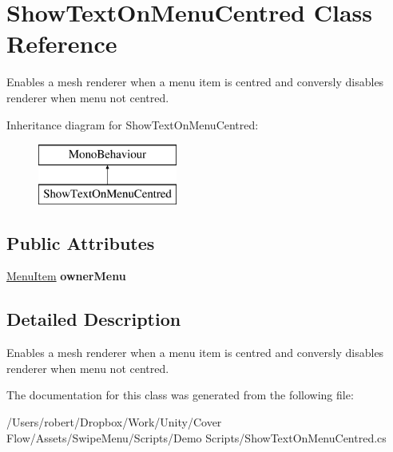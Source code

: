 \hypertarget{class_show_text_on_menu_centred}{}\section{Show\+Text\+On\+Menu\+Centred Class Reference}
\label{class_show_text_on_menu_centred}


Enables a mesh renderer when a menu item is centred and conversly disables renderer when menu not centred.  


Inheritance diagram for Show\+Text\+On\+Menu\+Centred\+:\begin{figure}[H]
\begin{center}
\leavevmode
\includegraphics[height=2.000000cm]{class_show_text_on_menu_centred}
\end{center}
\end{figure}
\subsection*{Public Attributes}
\begin{DoxyCompactItemize}
\item 
\hypertarget{class_show_text_on_menu_centred_afa1ef3012488c1a9c681a4e8aa6243d0}{}\hyperlink{class_swipe_menu_1_1_menu_item}{Menu\+Item} {\bfseries owner\+Menu}\label{class_show_text_on_menu_centred_afa1ef3012488c1a9c681a4e8aa6243d0}

\end{DoxyCompactItemize}


\subsection{Detailed Description}
Enables a mesh renderer when a menu item is centred and conversly disables renderer when menu not centred. 



The documentation for this class was generated from the following file\+:\begin{DoxyCompactItemize}
\item 
/\+Users/robert/\+Dropbox/\+Work/\+Unity/\+Cover Flow/\+Assets/\+Swipe\+Menu/\+Scripts/\+Demo Scripts/Show\+Text\+On\+Menu\+Centred.\+cs\end{DoxyCompactItemize}
